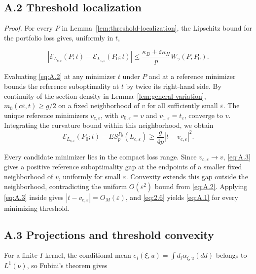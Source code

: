 \subsection{A.2 Threshold localization}\label{proof:threshold-localization}

\textit{Proof.}
For every \(P\) in Lemma~\ref{lem:threshold-localization}, the Lipschitz bound for the portfolio loss gives, uniformly in \(t\),

\begin{equation}
|\mathscr E_{L_{c,\varepsilon}}(P;t)
-\mathscr E_{L_{c,\varepsilon}}(P_0;t)|
\le\frac{\kappa_B+\varepsilon \kappa_H}{p}W_\gamma(P,P_0).
\tag{A.2}\label{eq:A.2}
\end{equation}

Evaluating \eqref{eq:A.2} at any minimizer \(t\) under \(P\) and at a reference minimizer bounds the reference suboptimality at \(t\) by twice its right-hand side. By continuity of the section density in Lemma~\ref{lem:general-variation}, \(m_0(c\varepsilon,t)\ge g/2\) on a fixed neighborhood of \(v\) for all sufficiently small \(\varepsilon\). The unique reference minimizers \(v_{c,\varepsilon}\), with \(v_{0,\varepsilon}=v\) and \(v_{1,\varepsilon}=t_\varepsilon\), converge to \(v\). Integrating the curvature bound within this neighborhood, we obtain
\begin{equation}
\mathscr E_{L_{c,\varepsilon}}(P_0;t)
-ES_p^{P_0}(L_{c,\varepsilon})
\ge\frac{g}{4p}|t-v_{c,\varepsilon}|^2.
\tag{A.3}\label{eq:A.3}
\end{equation}

Every candidate minimizer lies in the compact loss range. Since \(v_{c,\varepsilon}\to v\), \eqref{eq:A.3} gives a positive reference suboptimality gap at the endpoints of a smaller fixed neighborhood of \(v\), uniformly for small \(\varepsilon\). Convexity extends this gap outside the neighborhood, contradicting the uniform \(O(\varepsilon^2)\) bound from \eqref{eq:A.2}. Applying \eqref{eq:A.3} inside gives \(|t-v_{c,\varepsilon}|=O_M(\varepsilon)\), and \eqref{eq:2.6} yields \eqref{eq:A.1} for every minimizing threshold.\unskip\nobreak\hfill\proofbox

\subsection{A.3 Projections and threshold convexity}
\label{app:projections}
For a finite-\(I\) kernel, the conditional mean \(e_i(\xi,u)=\int d_i\alpha_{\xi,u}(dd)\) belongs to \(L^1(\nu)\), so Fubini's theorem gives

